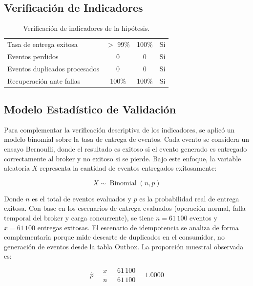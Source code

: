 \subsection{Verificación de Indicadores}

\begin{table}[H]
    \centering
    \caption{Verificación de indicadores de la hipótesis.}
    \small
    \begin{tabularx}{\textwidth}{@{} Y c c c @{}}
        \toprule
         &  &  &  \\
        \midrule
        Tasa de entrega exitosa & $>$ 99\% & 100\% & Sí \\
        Eventos perdidos & 0 & 0 & Sí \\
        Eventos duplicados procesados & 0 & 0 & Sí \\
        Recuperación ante fallas & 100\% & 100\% & Sí \\
        \bottomrule
    \end{tabularx}
    \label{tab:verificacion_hipotesis}
\end{table}

\subsection{Modelo Estadístico de Validación}

Para complementar la verificación descriptiva de los indicadores, se aplicó un modelo binomial sobre la tasa de entrega de eventos. Cada evento se considera un ensayo Bernoulli, donde el resultado es exitoso si el evento generado es entregado correctamente al broker y no exitoso si se pierde. Bajo este enfoque, la variable aleatoria $X$ representa la cantidad de eventos entregados exitosamente:

\[
    X \sim \operatorname{Binomial}(n, p)
\]

Donde $n$ es el total de eventos evaluados y $p$ es la probabilidad real de entrega exitosa. Con base en los escenarios de entrega evaluados (operación normal, falla temporal del broker y carga concurrente), se tiene $n = 61\,100$ eventos y $x = 61\,100$ entregas exitosas. El escenario de idempotencia se analiza de forma complementaria porque mide descarte de duplicados en el consumidor, no generación de eventos desde la tabla Outbox. La proporción muestral observada es:

\[
    \hat{p} = \frac{x}{n} = \frac{61\,100}{61\,100} = 1.0000
\]

